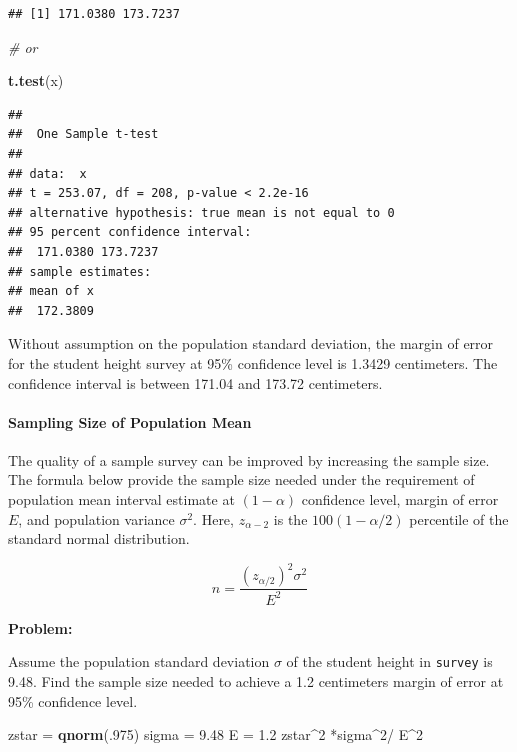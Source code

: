 \documentclass[]{article}
\newenvironment{Shaded}{\begin{snugshade}}{\end{snugshade}}
\newcommand{\KeywordTok}[1]{\textcolor[rgb]{0.13,0.29,0.53}{\textbf{{#1}}}}
\newcommand{\DecValTok}[1]{\textcolor[rgb]{0.00,0.00,0.81}{{#1}}}
\newcommand{\FloatTok}[1]{\textcolor[rgb]{0.00,0.00,0.81}{{#1}}}
\newcommand{\StringTok}[1]{\textcolor[rgb]{0.31,0.60,0.02}{{#1}}}
\newcommand{\CommentTok}[1]{\textcolor[rgb]{0.56,0.35,0.01}{\textit{{#1}}}}
\newcommand{\NormalTok}[1]{{#1}}
\numberwithin{equation}{section}
\begin{document}
\begin{verbatim}
## [1] 171.0380 173.7237
\end{verbatim}

\begin{Shaded}
\begin{Highlighting}[]
\CommentTok{# or }

\KeywordTok{t.test}\NormalTok{(x)}
\end{Highlighting}
\end{Shaded}

\begin{verbatim}
## 
##  One Sample t-test
## 
## data:  x
## t = 253.07, df = 208, p-value < 2.2e-16
## alternative hypothesis: true mean is not equal to 0
## 95 percent confidence interval:
##  171.0380 173.7237
## sample estimates:
## mean of x 
##  172.3809
\end{verbatim}

Without assumption on the population standard deviation, the margin of
error for the student height survey at 95\% confidence level is 1.3429
centimeters. The confidence interval is between 171.04 and 173.72
centimeters.

\paragraph{Sampling Size of Population
Mean}\label{sampling-size-of-population-mean}

The quality of a sample survey can be improved by increasing the sample
size. The formula below provide the sample size needed under the
requirement of population mean interval estimate at \((1-\alpha)\)
confidence level, margin of error \(E\), and population variance
\(\sigma^2\). Here, \(z_{\alpha-2}\) is the \(100(1 -\alpha/2)\)
percentile of the standard normal distribution.

\[
    n = \frac{(z_{\alpha/2})^2 \sigma^2}{E^2}
\]

\textbf{Problem:}

Assume the population standard deviation \(\sigma\) of the student
height in \texttt{survey} is 9.48. Find the sample size needed to
achieve a 1.2 centimeters margin of error at 95\% confidence level.

\begin{Shaded}
\begin{Highlighting}[]
\NormalTok{zstar =}\StringTok{ }\KeywordTok{qnorm}\NormalTok{(.}\DecValTok{975}\NormalTok{) }
\NormalTok{sigma =}\StringTok{ }\FloatTok{9.48} 
\NormalTok{E =}\StringTok{ }\FloatTok{1.2} 
\NormalTok{zstar^}\DecValTok{2} \NormalTok{*sigma^}\DecValTok{2}\NormalTok{/}\StringTok{ }\NormalTok{E^}\DecValTok{2} 
\end{Highlighting}
\end{Shaded}
\end{document}
